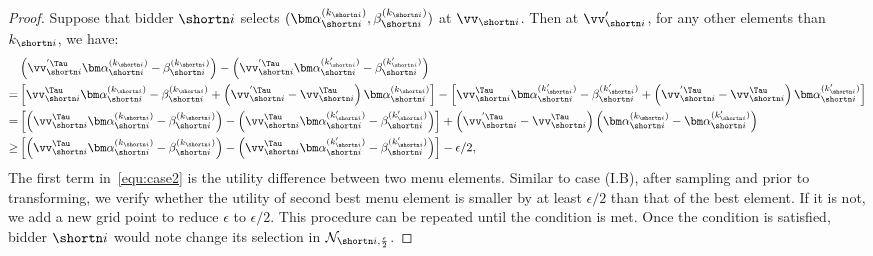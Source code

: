 \begin{proof}
Suppose that bidder $\shortn i$ selects $(\bm\alpha_{\shortn i}^{(k_{\shortn i})}, \beta_{\shortn i}^{(k_{\shortn i})})$ at $\vv_{\shortn i}$. Then at $\vv_{\shortn i}'$, for any other elements than $k_{\shortn i}$, we have:
\begin{align}
    & \left(\vv_{\shortn i}^{'\Tau} \bm\alpha_{\shortn i}^{(k_{\shortn i})} - \beta_{\shortn i}^{(k_{\shortn i})}\right) - \left(\vv_{\shortn i}^{'\Tau} \bm\alpha_{\shortn i}^{(k_{\shortn i}')} - \beta_{\shortn i}^{(k_{\shortn i}')}\right) \nonumber\\
    = & \left[\vv_{\shortn i}^{\Tau} \bm\alpha_{\shortn i}^{(k_{\shortn i})} - \beta_{\shortn i}^{(k_{\shortn i})} + \left(\vv_{\shortn i}^{'\Tau}-\vv_{\shortn i}^{\Tau} \right)\bm\alpha_{\shortn i}^{(k_{\shortn i})}\right] - \left[\vv_{\shortn i}^{\Tau} \bm\alpha_{\shortn i}^{(k_{\shortn i}')} - \beta_{\shortn i}^{(k_{\shortn i}')} + \left(\vv_{\shortn i}^{'\Tau}-\vv_{\shortn i}^{\Tau} \right)\bm\alpha_{\shortn i}^{(k_{\shortn i}')}\right]\nonumber\\
    = & \left[\left(\vv_{\shortn i}^{\Tau} \bm\alpha_{\shortn i}^{(k_{\shortn i})} - \beta_{\shortn i}^{(k_{\shortn i})}\right) - \left(\vv_{\shortn i}^{\Tau} \bm\alpha_{\shortn i}^{(k_{\shortn i}')} - \beta_{\shortn i}^{(k_{\shortn i}')}\right)\right] + \left(\vv_{\shortn i}^{'\Tau}-\vv_{\shortn i}^{\Tau} \right)\left(\bm\alpha_{\shortn i}^{(k_{\shortn i})}-\bm\alpha_{\shortn i}^{(k_{\shortn i}')}\right) \nonumber\\
    \ge &\left[\left(\vv_{\shortn i}^{\Tau} \bm\alpha_{\shortn i}^{(k_{\shortn i})} - \beta_{\shortn i}^{(k_{\shortn i})}\right) - \left(\vv_{\shortn i}^{\Tau} \bm\alpha_{\shortn i}^{(k_{\shortn i}')} - \beta_{\shortn i}^{(k_{\shortn i}')}\right)\right]  -  \epsilon/2, \label{equ:case2}
\end{align}
The first term in~\ref{equ:case2} is the utility difference between two menu elements. Similar to case (I.B), after sampling and prior to transforming, we verify whether the utility of second best menu element is smaller by at least $\epsilon/2$ than that of the best element. If it is not, we add a new grid point to reduce $\epsilon$ to $\epsilon/2$. This procedure can be repeated until the condition is met. Once the condition is satisfied, bidder $\shortn i$ would note change its selection in $\mathcal{N}_{\shortn i,\frac{\epsilon}{2}}$.
\end{proof}

